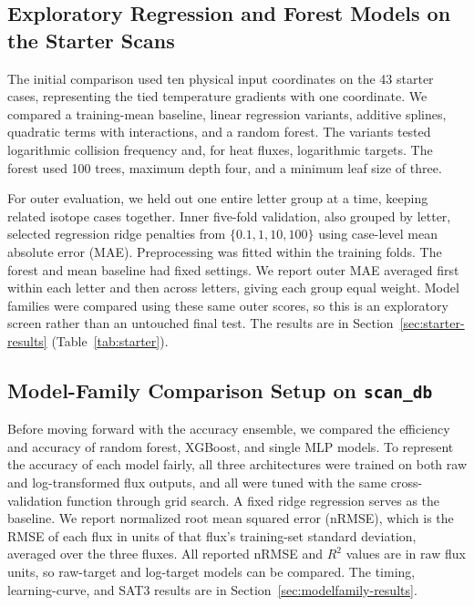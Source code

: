 \documentclass[12pt,letterpaper]{article}
\begin{document}
\subsection{Exploratory Regression and Forest Models on the Starter Scans}
\label{sec:starter-methods}

The initial comparison used ten physical input coordinates on the 43 starter
cases, representing the tied temperature gradients with one coordinate.
We compared a training-mean baseline, linear regression variants,
additive splines, quadratic terms with interactions, and a random forest.
The variants tested logarithmic collision frequency and, for heat fluxes,
logarithmic targets. The forest used 100 trees, maximum depth four, and a
minimum leaf size of three.

For outer evaluation, we held out one entire letter group at a time, keeping
related isotope cases together. Inner five-fold validation, also grouped by
letter, selected regression ridge penalties from $\{0.1,1,10,100\}$ using
case-level mean absolute error (MAE). Preprocessing was fitted within the
training folds. The forest and mean baseline had fixed settings. We report
outer MAE averaged first within each letter and then across letters, giving
each group equal weight. Model families were compared using these same outer
scores, so this is an exploratory screen rather than an untouched final test.
The results are in Section~\ref{sec:starter-results} (Table~\ref{tab:starter}).

\subsection{Model-Family Comparison Setup on \texttt{scan\_db}}
\label{sec:modelfamily-setup}

Before moving forward with the accuracy ensemble, we compared the efficiency
and accuracy of random forest, XGBoost, and single MLP models. To represent the
accuracy of each model fairly, all three architectures were trained on both raw
and log-transformed flux outputs, and all were tuned with the same
cross-validation function through grid search. A fixed ridge regression serves
as the baseline. We report normalized root mean squared error (nRMSE), which is the RMSE of each
flux in units of that flux's training-set standard deviation, averaged over
the three fluxes. All reported nRMSE and $R^2$ values are in raw flux units, so
raw-target and log-target models can be compared. The timing, learning-curve,
and SAT3 results are in Section~\ref{sec:modelfamily-results}.
\end{document}
